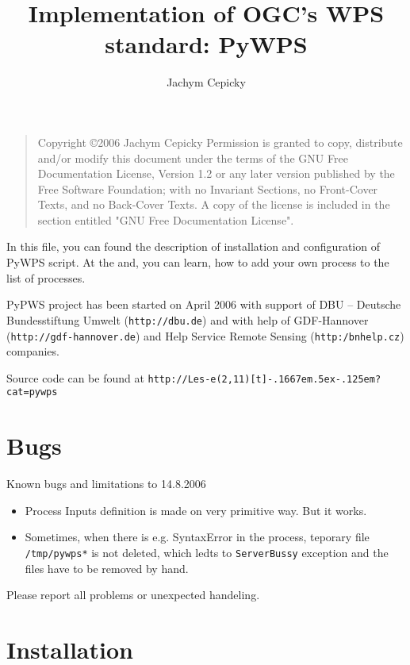\documentclass[a4paper,11pt]{article}
\author{Jachym Cepicky}
\title{Implementation of OGC's WPS standard: PyWPS}
\makeatletter
\def\Lesejk{{\tt{}Les-e\makebox(2,11)[t]{\rotatebox{35}{j}}\kern-.1667em\lower.5ex\hbox{\rotatebox{315}{k}}\kern-.125em\@}}
\makeatother
\begin{document}
\maketitle{}

\bigskip
\begin{quote}
    Copyright \copyright  2006 Jachym Cepicky
    Permission is granted to copy, distribute and/or modify this document
    under the terms of the GNU Free Documentation License, Version 1.2
    or any later version published by the Free Software Foundation;
    with no Invariant Sections, no Front-Cover Texts, and no Back-Cover Texts.
    A copy of the license is included in the section entitled "GNU
    Free Documentation License".
\end{quote}
\bigskip
    

    In this file, you can found the description of installation and
    configuration of PyWPS script. At the and, you can learn, how to add
    your own process to the list of processes. 

    PyPWS project has been started on April 2006 with support of DBU -- Deutsche Bundesstiftung Umwelt (\texttt{http://dbu.de}) and with help of GDF-Hannover (\texttt{http://gdf-hannover.de}) and Help Service Remote Sensing (\texttt{http:/bnhelp.cz}) companies.
     
    Source code can be found at \texttt{http://}\Lesejk\texttt{?cat=pywps}
     \tableofcontents

    \newpage
     
    \section{Bugs}
    Known bugs and limitations to 14.8.2006
    \begin{itemize}
    \item  Process Inputs definition is made on very primitive way. But it works.
    \item Sometimes, when there is e.g. SyntaxError in the process, teporary file \texttt{/tmp/pywps*} is not deleted, which ledts to \texttt{ServerBussy} exception and the files have to be removed by hand.
    \end{itemize}

    Please report all problems or unexpected handeling.

    \section{Installation}
     
\end{document}
